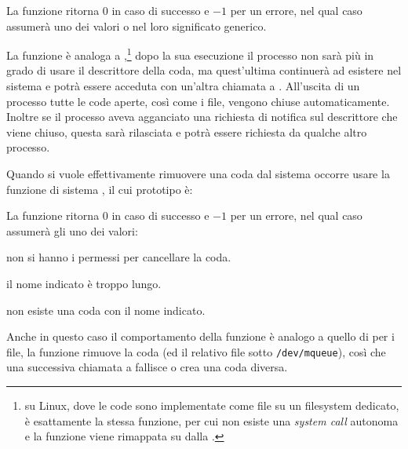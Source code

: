 \begin{funcproto}{

}

{La funzione ritorna $0$ in caso di successo e $-1$ per un errore, nel qual
  caso  assumerà uno dei valori  o  nel
  loro significato generico.
}  
\end{funcproto}

La funzione è analoga a ,\footnote{su Linux, dove le code sono
  implementate come file su un filesystem dedicato, è esattamente la stessa
  funzione, per cui non esiste una \textit{system call} autonoma e la funzione
  viene rimappata su  dalla .}  dopo la sua esecuzione
il processo non sarà più in grado di usare il descrittore della coda, ma
quest'ultima continuerà ad esistere nel sistema e potrà essere acceduta con
un'altra chiamata a . All'uscita di un processo tutte le code
aperte, così come i file, vengono chiuse automaticamente. Inoltre se il
processo aveva agganciato una richiesta di notifica sul descrittore che viene
chiuso, questa sarà rilasciata e potrà essere richiesta da qualche altro
processo.

Quando si vuole effettivamente rimuovere una coda dal sistema occorre usare la
funzione di sistema , il cui prototipo è:

\begin{funcproto}{

}

{La funzione ritorna $0$ in caso di successo e $-1$ per un errore, nel qual
  caso  assumerà gli uno dei valori:
  \begin{errlist}
    \item[\errcode{EACCES}] non si hanno i permessi per cancellare la coda.
    \item[\errcode{ENAMETOOLONG}] il nome indicato è troppo lungo.
    \item[\errcode{ENOENT}] non esiste una coda con il nome indicato.
  \end{errlist}
}  
\end{funcproto}

Anche in questo caso il comportamento della funzione è analogo a quello di
 per i file, la funzione rimuove la coda  (ed il
relativo file sotto \texttt{/dev/mqueue}), così che una successiva chiamata a
 fallisce o crea una coda diversa.

